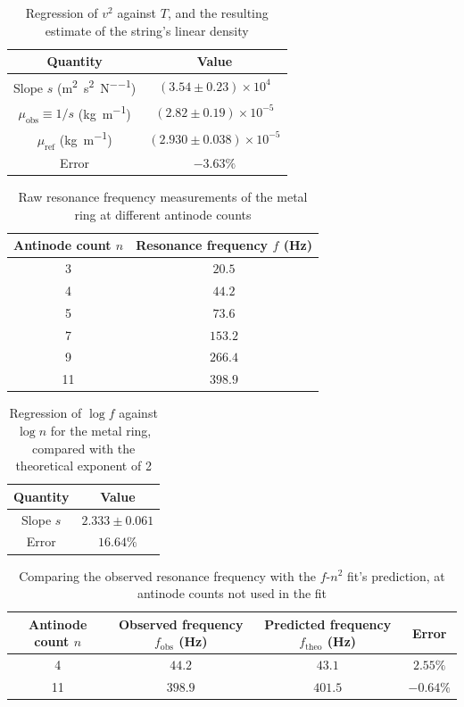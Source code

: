 \begin{table}[htb!]
\centering
\caption{Regression of $v^{2}$ against $T$, and the resulting estimate of the string's linear density}
\begin{tabular}{cc}
\toprule
Quantity & Value \\
\midrule
Slope $s$ (\unit{\m\squared\per\s\squared\per\N}) & $(3.54 \pm 0.23)\times 10^{4}$ \\
$\mu_{\text{obs}}\equiv1/s$ (\unit{\kg\per\m}) & $(2.82 \pm 0.19)\times 10^{-5}$ \\
$\mu_{\text{ref}}$ (\unit{\kg\per\m}) & $(2.930 \pm 0.038)\times 10^{-5}$ \\
Error & $-3.63\%$ \\
\bottomrule
\end{tabular}
\end{table}
\begin{table}[htb!]
\centering
\caption{Raw resonance frequency measurements of the metal ring at different antinode counts}
\begin{tabular}{cc}
\toprule
Antinode count $n$ & Resonance frequency $f$ (\unit{\Hz}) \\
\midrule
3 & $20.5$ \\
4 & $44.2$ \\
5 & $73.6$ \\
7 & $153.2$ \\
9 & $266.4$ \\
11 & $398.9$ \\
\bottomrule
\end{tabular}
\end{table}
\begin{table}[htb!]
\centering
\caption{Regression of $\log f$ against $\log n$ for the metal ring, compared with the theoretical exponent of 2}
\begin{tabular}{cc}
\toprule
Quantity & Value \\
\midrule
Slope $s$ & $2.333 \pm 0.061$ \\
Error & $16.64\%$ \\
\bottomrule
\end{tabular}
\end{table}
\begin{table}[htb!]
\centering
\caption{Comparing the observed resonance frequency with the $f$-$n^{2}$ fit's prediction, at antinode counts not used in the fit}
\begin{tabular}{cccc}
\toprule
Antinode count $n$ & Observed frequency $f_{\text{obs}}$ (\unit{\Hz}) & Predicted frequency $f_{\text{theo}}$ (\unit{\Hz}) & Error \\
\midrule
4 & $44.2$ & $43.1$ & $2.55\%$ \\
11 & $398.9$ & $401.5$ & $-0.64\%$ \\
\bottomrule
\end{tabular}
\end{table}
